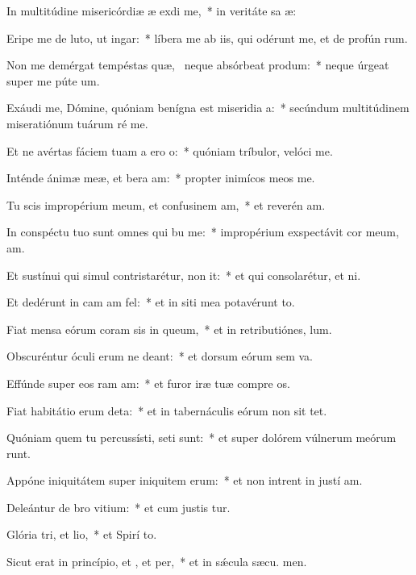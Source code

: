 \item In multitúdine misericórdiæ æ exdi me,~* in veritáte sa æ:
\item Eripe me de luto, ut  ingar:~* líbera me ab iis, qui odérunt me, et de profún rum.
\item Non me demérgat tempéstas quæ,~\pscross{} neque absórbeat  produm:~* neque úrgeat super me púte  um.
\item Exáudi me, Dómine, quóniam benígna est miseridia a:~* secúndum multitúdinem miseratiónum tuárum ré  me.
\item Et ne avértas fáciem tuam a ero o:~* quóniam tríbulor, velóci  me.
\item Inténde ánimæ meæ, et bera am:~* propter inimícos meos  me.
\item Tu scis impropérium meum, et confusinem am,~* et reverén am.
\item In conspéctu tuo sunt omnes qui bu me:~* impropérium exspectávit cor meum,  am.
\item Et sustínui qui simul contristarétur,  non it:~* et qui consolarétur, et  ni.
\item Et dedérunt in cam am fel:~* et in siti mea potavérunt  to.
\item Fiat mensa eórum coram sis in queum,~* et in retributiónes,   lum.
\item Obscuréntur óculi erum ne deant:~* et dorsum eórum sem va.
\item Effúnde super eos ram am:~* et furor iræ tuæ compre os.
\item Fiat habitátio erum deta:~* et in tabernáculis eórum non sit  tet.
\item Quóniam quem tu percussísti, seti sunt:~* et super dolórem vúlnerum meórum runt.
\item Appóne iniquitátem super iniquitem erum:~* et non intrent in justí am.
\item Deleántur de bro vitium:~* et cum justis  tur.
\item Glória tri, et lio,~* et Spirí to.
\item Sicut erat in princípio, et , et per,~* et in sǽcula sæcu. men.
